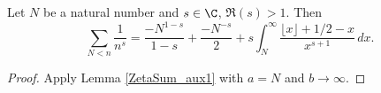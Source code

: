 \begin{lemma}
\label{ZetaSum_aux2}
\leanok
Let $N$ be a natural number and $s\in \C$, $\Re(s)>1$.
  Then
  \[
  \sum_{N < n} \frac{1}{n^s} =  \frac{- N^{1-s}}{1-s} + \frac{-N^{-s}}{2}
    + s \int_N^\infty \frac{\lfloor x\rfloor + 1/2 - x}{x^{s+1}} \, dx.
  \]
\end{lemma}
\begin{proof}
\leanok
Apply Lemma \ref{ZetaSum_aux1} with $a=N$ and $b\to \infty$.
\end{proof}
